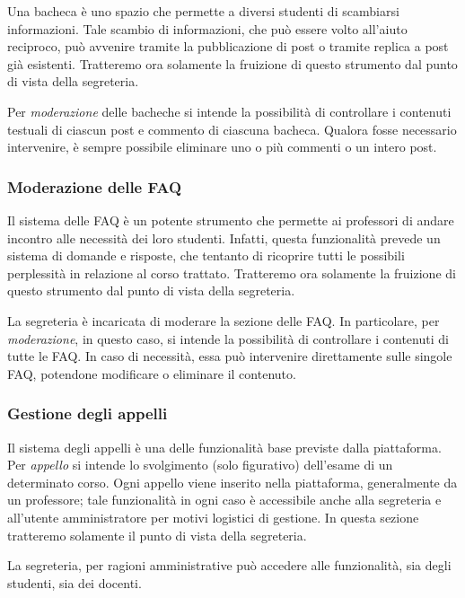 \documentclass [a4paper,11pt]{book}
\begin{document}
Una bacheca è uno spazio che permette a diversi studenti di scambiarsi informazioni. Tale scambio di informazioni, che può essere volto all'aiuto reciproco, può avvenire tramite la pubblicazione di post o tramite replica a post già esistenti. Tratteremo ora solamente la fruizione di questo strumento dal punto di vista della segreteria.

Per \emph{moderazione} delle bacheche si intende la possibilità di controllare i contenuti testuali di ciascun post e commento di ciascuna bacheca. Qualora fosse necessario intervenire, è sempre possibile eliminare uno o più commenti o un intero post. 

\medskip

\subsubsection{Moderazione delle FAQ}

Il sistema delle FAQ è un potente strumento che permette ai professori di andare incontro alle necessità dei loro studenti. Infatti, questa funzionalità prevede un sistema di domande e risposte, che tentanto di ricoprire tutti le possibili perplessità in relazione al corso trattato. Tratteremo ora solamente la fruizione di questo strumento dal punto di vista della segreteria.

La segreteria è incaricata di moderare la sezione delle FAQ. In particolare, per \emph{moderazione}, in questo caso, si intende la possibilità di controllare i contenuti di tutte le FAQ. In caso di necessità, essa può intervenire direttamente sulle singole FAQ, potendone modificare o eliminare il contenuto. 


\medskip

\subsubsection{Gestione degli appelli}

Il sistema degli appelli è una delle funzionalità base previste dalla piattaforma. Per \emph{appello} si intende lo svolgimento (solo figurativo) dell'esame di un determinato corso. Ogni appello viene inserito nella piattaforma, generalmente da un professore; tale funzionalità in ogni caso è accessibile anche alla segreteria e all'utente amministratore per motivi logistici di gestione. In questa sezione tratteremo solamente il punto di vista della segreteria.

La segreteria, per ragioni amministrative può accedere alle funzionalità, sia degli studenti, sia dei docenti.
\medskip
\end{document}
